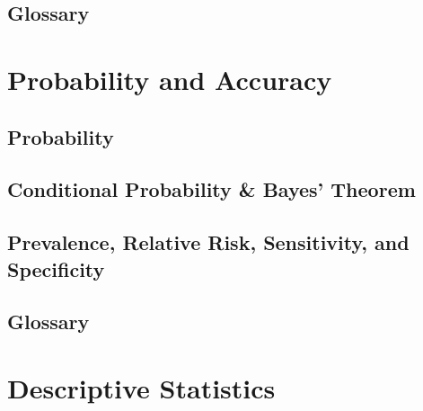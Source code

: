 







\pagestyle{plain}

\maketitle %
% 









\section*{Glossary}


\chapter{Probability and Accuracy } 
\section{Probability}
\section{Conditional Probability \& Bayes’ Theorem}
\section{Prevalence, Relative Risk, Sensitivity, and Specificity}
\section*{Glossary}

\chapter{Descriptive Statistics } 
